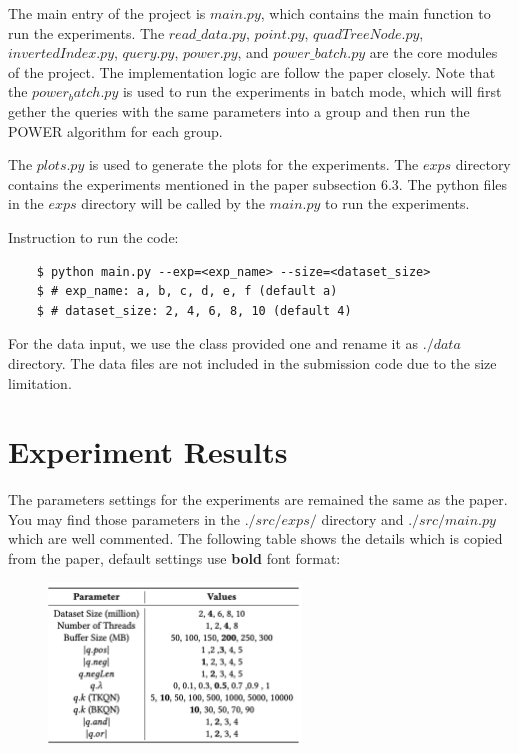 \documentclass[]{IEEEphot}
\begin{document}
The main entry of the project is $main.py$, which contains the main function to run the experiments. The $read\_data.py$, $point.py$, $quadTreeNode.py$, $invertedIndex.py$, $query.py$, $power.py$, and $power\_batch.py$ are the core modules of the project. The implementation logic are follow the paper closely. Note that the $power_batch.py$ is used to run the experiments in batch mode, which will first gether the queries with the same parameters into a group and then run the POWER algorithm for each group.

The $plots.py$ is used to generate the plots for the experiments. The $exps$ directory contains the experiments mentioned in the paper subsection 6.3. The python files in the $exps$ directory will be called by the $main.py$ to run the experiments.

Instruction to run the code:

\begin{lstlisting}
    $ python main.py --exp=<exp_name> --size=<dataset_size>
    $ # exp_name: a, b, c, d, e, f (default a)
    $ # dataset_size: 2, 4, 6, 8, 10 (default 4)
\end{lstlisting}

For the data input, we use the class provided one and rename it as $./data$ directory. The data files are not included in the submission code due to the size limitation.

\newpage

\section{Experiment Results}

The parameters settings for the experiments are remained the same as the paper. You may find those parameters in the $./src/exps/$ directory and $./src/main.py$ which are well commented. The following table shows the details which is copied from the paper\cite{ref1-original-paper}, default settings use \textbf{bold} font format:

\begin{figure}[h]
    \centering
    \includegraphics[width=0.6\textwidth]{pics/exp_settings.png}
\end{figure}
\end{document}
